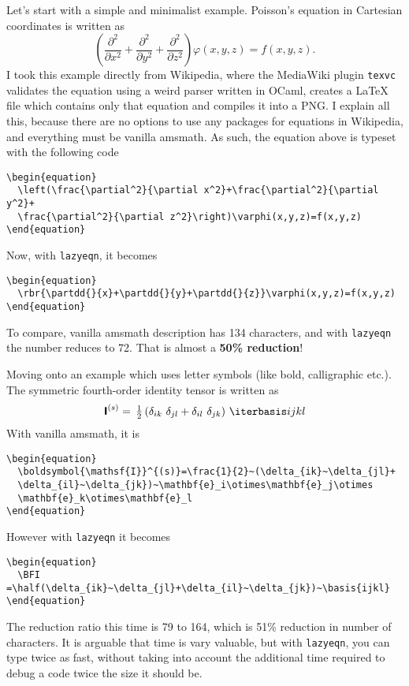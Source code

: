\documentclass[DIV15]{scrartcl}
\begin{document}
Let's start with a simple and minimalist example.
Poisson's equation in Cartesian coordinates is written as
%
\begin{equation}
  \left( \frac{\partial^2}{\partial x^2} + \frac{\partial^2}{\partial y^2} +
  \frac{\partial^2}{\partial z^2} \right)\varphi(x,y,z) = f(x,y,z).
\end{equation}
%
I took this example directly from Wikipedia, where the MediaWiki plugin
\texttt{texvc} validates the equation using a weird parser written in OCaml,
creates a \LaTeX{} file which contains only that equation and compiles it into a
PNG. I explain all this, because there are no options to use any packages for
equations in Wikipedia, and everything must be vanilla amsmath. As such, the
equation above is typeset with the following code
%
\begin{verbatim}
\begin{equation}
  \left(\frac{\partial^2}{\partial x^2}+\frac{\partial^2}{\partial y^2}+
  \frac{\partial^2}{\partial z^2}\right)\varphi(x,y,z)=f(x,y,z)
\end{equation}
\end{verbatim}
%
Now, with \texttt{lazyeqn}, it becomes
%
%
\begin{verbatim}
\begin{equation}
  \rbr{\partdd{}{x}+\partdd{}{y}+\partdd{}{z}}\varphi(x,y,z)=f(x,y,z)
\end{equation}
\end{verbatim}
%
To compare, vanilla amsmath description has 134 characters, and with
\texttt{lazyeqn} the number reduces to 72. That is almost a \textbf{50\% reduction}!

Moving onto an example which uses letter symbols (like bold, calligraphic etc.).
The symmetric fourth-order identity tensor is written as
%
\begin{equation}
  \BFI^{(s)} =\half(\delta_{ik}~\delta_{jl}+\delta_{il}~\delta_{jk})~\basis{ijkl}
\end{equation}
%
With vanilla amsmath, it is
\begin{verbatim}
\begin{equation}
  \boldsymbol{\mathsf{I}}^{(s)}=\frac{1}{2}~(\delta_{ik}~\delta_{jl}+
  \delta_{il}~\delta_{jk})~\mathbf{e}_i\otimes\mathbf{e}_j\otimes
  \mathbf{e}_k\otimes\mathbf{e}_l
\end{equation}
\end{verbatim}
%
However with \texttt{lazyeqn} it becomes
%
\begin{verbatim}
\begin{equation}
  \BFI =\half(\delta_{ik}~\delta_{jl}+\delta_{il}~\delta_{jk})~\basis{ijkl}
\end{equation}
\end{verbatim}
%
The reduction ratio this time is 79 to 164, which is 51\% reduction in number of
characters. It is arguable that time is vary valuable, but with
\texttt{lazyeqn}, you can type twice as fast, without taking into account
the additional time required to debug a code twice the size it should be.
\end{document}
